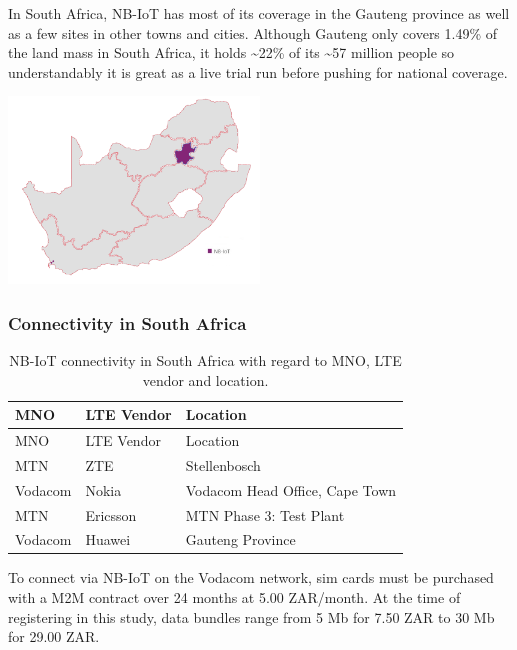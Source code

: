 \documentclass[]{article}
\makeatletter
\let\origfigure\figure
\let\endorigfigure\endfigure
\renewenvironment{figure}[1][2] {
    \expandafter\origfigure\expandafter[H]
} {
    \endorigfigure
}
\newcounter{tableno}
\newenvironment{tablenos:no-prefix-table-caption}{
    \caption@ifcompatibility{}{
    \let\oldthetable\thetable
    \let\oldtheHtable\theHtable
    \renewcommand{\thetable}{tableno:\thetableno}
    \renewcommand{\theHtable}{tableno:\thetableno}
    \stepcounter{tableno}
    \captionsetup{labelformat=empty}
    }
}{
    \caption@ifcompatibility{}{
    \captionsetup{labelformat=default}
    \let\thetable\oldthetable
    \let\theHtable\oldtheHtable
    \addtocounter{table}{-1}
    }
}
\makeatother
\begin{document}
In South Africa, NB-IoT has most of its coverage in the Gauteng province
as well as a few sites in other towns and cities. Although Gauteng only
covers 1.49\% of the land mass in South Africa, it holds
\textasciitilde{}22\% of its \textasciitilde{}57 million people so
understandably it is great as a live trial run before pushing for
national coverage.

\begin{figure}
\centering
\includegraphics[width=0.5\textwidth,height=\textheight]{../images/GautengvsSouthAfrica.png}
\caption{NB-IoT coverage in South Africa}
\end{figure}

\hypertarget{connectivity}{%
\subsubsection{Connectivity in South Africa}\label{connectivity}}

\begin{tablenos:no-prefix-table-caption}

\begin{longtable}[]{@{}lll@{}}
\caption{NB-IoT connectivity in South Africa with regard to MNO, LTE
vendor and location.}\tabularnewline
\toprule
MNO & LTE Vendor & Location\tabularnewline
\midrule
\endfirsthead
\toprule
MNO & LTE Vendor & Location\tabularnewline
\midrule
\endhead
MTN & ZTE & Stellenbosch\tabularnewline
Vodacom & Nokia & Vodacom Head Office, Cape Town\tabularnewline
MTN & Ericsson & MTN Phase 3: Test Plant\tabularnewline
Vodacom & Huawei & Gauteng Province\tabularnewline
\bottomrule
\end{longtable}

\end{tablenos:no-prefix-table-caption}

To connect via NB-IoT on the Vodacom network, sim cards must be
purchased with a M2M contract over 24 months at 5.00 ZAR/month. At the
time of registering in this study, data bundles range from 5 Mb for 7.50
ZAR to 30 Mb for 29.00 ZAR.
\end{document}
